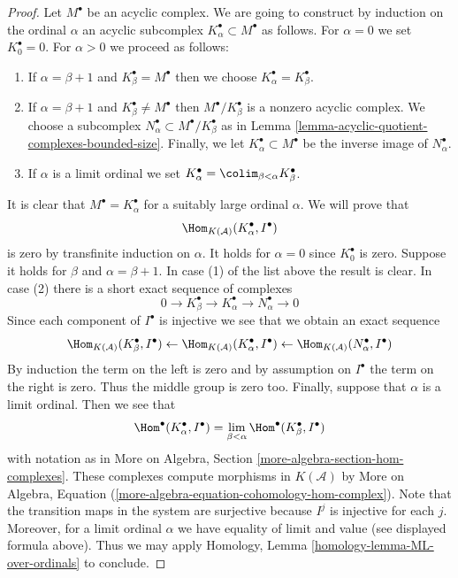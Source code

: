 \begin{proof}
Let $M^\bullet$ be an acyclic complex. We are going to construct by
induction on the ordinal $\alpha$ an acyclic subcomplex
$K_\alpha^\bullet \subset M^\bullet$ as follows.
For $\alpha = 0$ we set $K_0^\bullet = 0$. For $\alpha > 0$
we proceed as follows:
\begin{enumerate}
\item If $\alpha = \beta + 1$ and $K_\beta^\bullet = M^\bullet$
then we choose $K_\alpha^\bullet = K_\beta^\bullet$.
\item If $\alpha = \beta + 1$ and $K_\beta^\bullet \not = M^\bullet$
then $M^\bullet/K_\beta^\bullet$ is a nonzero acyclic complex.
We choose a subcomplex $N_\alpha^\bullet \subset M^\bullet/K_\beta^\bullet$
as in Lemma \ref{lemma-acyclic-quotient-complexes-bounded-size}.
Finally, we let $K_\alpha^\bullet \subset M^\bullet$
be the inverse image of $N_\alpha^\bullet$.
\item If $\alpha$ is a limit ordinal we set
$K_\alpha^\bullet = \colim_{\beta < \alpha} K_\beta^\bullet$.
\end{enumerate}
It is clear that $M^\bullet = K_\alpha^\bullet$ for a suitably large
ordinal $\alpha$. We will prove that
$$
\Hom_{K(\mathcal{A})}(K_\alpha^\bullet, I^\bullet)
$$
is zero by transfinite induction on $\alpha$. It holds for $\alpha = 0$
since $K_0^\bullet$ is zero. Suppose it holds for $\beta$ and
$\alpha = \beta + 1$. In case (1) of the list above the result is clear.
In case (2) there is a short exact sequence of complexes
$$
0 \to K_\beta^\bullet \to K_\alpha^\bullet \to N_\alpha^\bullet \to 0
$$
Since each component of $I^\bullet$ is injective we see that we obtain
an exact sequence
$$
\Hom_{K(\mathcal{A})}(K_\beta^\bullet, I^\bullet) \leftarrow
\Hom_{K(\mathcal{A})}(K_\alpha^\bullet, I^\bullet) \leftarrow
\Hom_{K(\mathcal{A})}(N_\alpha^\bullet, I^\bullet)
$$
By induction the term on the left is zero and by assumption on $I^\bullet$
the term on the right is zero. Thus the middle group is zero too.
Finally, suppose that $\alpha$ is a limit ordinal. Then we see that
$$
\Hom^\bullet(K_\alpha^\bullet, I^\bullet) =
\lim_{\beta < \alpha} \Hom^\bullet(K_\beta^\bullet, I^\bullet)
$$
with notation as in
More on Algebra, Section \ref{more-algebra-section-hom-complexes}.
These complexes compute morphisms in $K(\mathcal{A})$ by
More on Algebra, Equation
(\ref{more-algebra-equation-cohomology-hom-complex}).
Note that the transition maps in the system are surjective
because $I^j$ is injective for each $j$. Moreover, for a limit
ordinal $\alpha$ we have equality of limit and value
(see displayed formula above). Thus we may apply
Homology, Lemma \ref{homology-lemma-ML-over-ordinals}
to conclude.
\end{proof}

